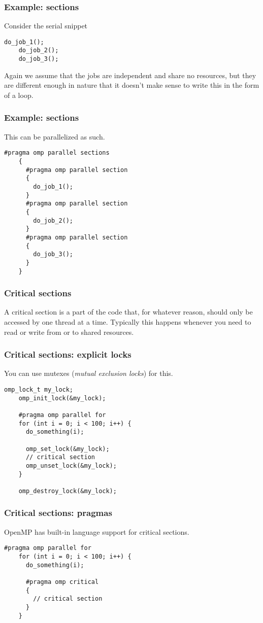 \begin{frame}[fragile]
  \frametitle{Example: sections}
  Consider the serial snippet
  \begin{lstlisting}[style=c]
    do_job_1();
    do_job_2();
    do_job_3();
  \end{lstlisting}
  Again we assume that the jobs are independent and share no resources, but they
  are different enough in nature that it doesn't make sense to write this in the
  form of a loop.
\end{frame}

\begin{frame}[fragile]
  \frametitle{Example: sections}
  This can be parallelized as such.
  \begin{lstlisting}[style=c, basicstyle=\ttfamily\footnotesize]
    #pragma omp parallel sections
    {
      #pragma omp parallel section
      {
        do_job_1();
      }
      #pragma omp parallel section
      {
        do_job_2();
      }
      #pragma omp parallel section
      {
        do_job_3();
      }
    }
  \end{lstlisting}
\end{frame}

\begin{frame}[fragile]
  \frametitle{Critical sections}
  \begin{center}
    \scalebox{0.8}{}
  \end{center}
  A critical section is a part of the code that, for whatever reason, should
  only be accessed by one thread at a time. Typically this happens whenever you
  need to read or write from or to shared resources.
\end{frame}

\begin{frame}[fragile]
  \frametitle{Critical sections: explicit locks}
  You can use mutexes (\emph{mutual exclusion locks}) for this.
  \begin{lstlisting}[style=c]
    omp_lock_t my_lock;
    omp_init_lock(&my_lock);

    #pragma omp parallel for
    for (int i = 0; i < 100; i++) {
      do_something(i);

      omp_set_lock(&my_lock);
      // critical section
      omp_unset_lock(&my_lock);
    }

    omp_destroy_lock(&my_lock);
  \end{lstlisting}
\end{frame}

\begin{frame}[fragile]
  \frametitle{Critical sections: pragmas}
  OpenMP has built-in language support for critical sections.
  \begin{lstlisting}[style=c]
    #pragma omp parallel for
    for (int i = 0; i < 100; i++) {
      do_something(i);

      #pragma omp critical
      {
        // critical section
      }
    }
  \end{lstlisting}
\end{frame}

